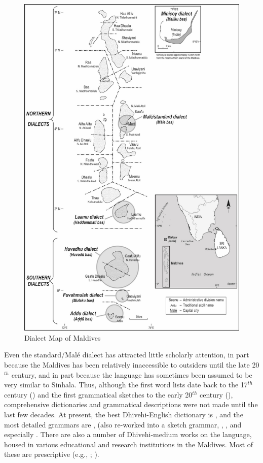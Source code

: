 \documentclass[output=paper]{langsci/langscibook}
\begin{document}
\begin{figure}
\includegraphics[width=\textwidth]{figures/lum-1.png}
\caption{Dialect Map of Maldives}
\label{fig:jl1}
\end{figure}


 Even the standard/Malé dialect has attracted little scholarly attention, in part because the Maldives has been relatively inaccessible to outsiders until the late 20$^{th}$ century, and in part because the language has sometimes been assumed to be very similar to Sinhala. Thus, although the first word lists date back to the 17$^{th}$ century (\citealt{Pyrard1619}) and the first grammatical sketches to the early 20$^{th}$ century (\citealt{Geiger1919}), comprehensive dictionaries and grammatical descriptions were not made until the last few decades. At present, the best Dhivehi-English dictionary is \cite{Reynolds2003}, and the most detailed grammars are \cite{Wijesundera1988}, \cite{Cain2000} (also re-worked into a sketch grammar, \citealt{CainGair2000}, \cite{Fritz2002}, and especially \cite{Gnanadesikan2017}. There are also a number of Dhivehi-medium works on the language, housed in various educational and research institutions in the Maldives. Most of these are prescriptive (e.g., \citealt{Ahmad1970}; \citealt{Saudiq2012}).
\end{document}
